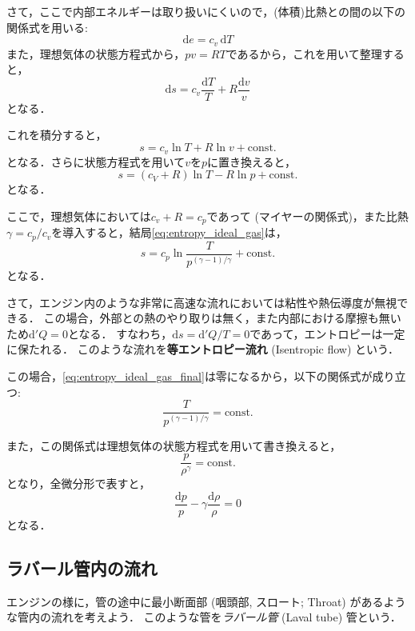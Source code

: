 \documentclass[uplatex,dvipdfmx,a4j,11pt]{jsreport}
\newcommand{\keyword}[1]{\textcolor{mainblue}{\textbf{#1}}}
\newcommand{\diff}{\mathrm{d}} %
\numberwithin{equation}{chapter}
\begin{document}
さて，ここで内部エネルギーは取り扱いにくいので，(体積)比熱との間の以下の関係式を用いる:
\begin{equation}
  \diff e = c_v \, \diff T
\end{equation}
また，理想気体の状態方程式から，$pv = RT$であるから，これを用いて整理すると，
\begin{equation}
  \diff s = c_v \frac{\diff T}{T} + R \frac{\diff v}{v}
\end{equation}
となる．

これを積分すると，
\begin{equation}
  s = c_v \ln T + R \ln v + \text{const.}
\end{equation}
となる．さらに状態方程式を用いて$v$を$p$に置き換えると，
\begin{equation}
  s = (c_V + R) \ln T - R \ln p + \text{const.}
  \label{eq:entropy_ideal_gas}
\end{equation}
となる．

ここで，理想気体においては$c_v + R = c_p$であって (マイヤーの関係式)，また比熱$\gamma = c_p/c_v$を導入すると，結局\cref{eq:entropy_ideal_gas}は，
\begin{equation}
  s = c_p \ln \frac{T}{p^{(\gamma-1) / \gamma}} + \text{const.}  
  \label{eq:entropy_ideal_gas_final}
\end{equation}
となる．

さて，エンジン内のような非常に高速な流れにおいては粘性や熱伝導度が無視できる．
この場合，外部との熱のやり取りは無く，また内部における摩擦も無いため$\diff'Q = 0$となる．
すなわち，$\diff s = \diff'Q/T = 0$であって，エントロピーは一定に保たれる．
このような流れを\keyword{等エントロピー流れ} (Isentropic flow) という．

この場合，\cref{eq:entropy_ideal_gas_final}は零になるから，以下の関係式が成り立つ:
\begin{equation}
  \frac{T}{p^{(\gamma-1)/\gamma}} = \text{const.}
  \label{eq:isentropic_relations}
\end{equation}

また，この関係式は理想気体の状態方程式を用いて書き換えると，
\begin{equation}
  \frac{p}{\rho^{\gamma}} = \text{const.}
\end{equation}
となり，全微分形で表すと，
\begin{equation}
  \frac{\diff p}{p} - \gamma \frac{\diff \rho}{\rho} = 0
  \label{eq:dp_drho}
\end{equation}
となる．


\subsection{ラバール管内の流れ}
エンジンの様に，管の途中に最小断面部 (咽頭部, スロート; Throat) があるような管内の流れを考えよう．
このような管を\emph{ラバール管} (Laval tube) 管という．
\end{document}
